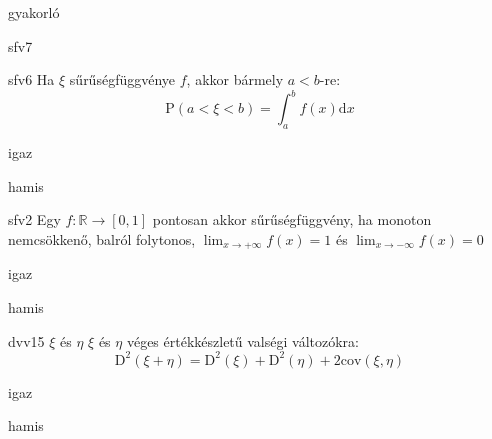 \documentclass[12pt]{article}
\begin{document}
\begin{quiz}{gyakorló}
\begin{multi}[feedback={Def.}]{sfv7}
\end{multi}
\begin{multi}[feedback={Def.}]{sfv6}
Ha $\xi$ sűrűségfüggvénye $f$, akkor bármely $a<b$-re:
$$
\mathrm{P}(a<\xi<b)=\int_{a}^{b}f(x)\mathrm{d } x
$$
\item* igaz
\item hamis
\end{multi}
\begin{multi}[feedback={Def.}]{sfv2}
Egy $f:\mathbb{R}\to [0,1]$ pontosan akkor sűrűségfüggvény, ha monoton nemcsökkenő, 
balról folytonos, $\lim_{x\to+\infty}f(x)=1$ és $\lim_{x\to-\infty}f(x)=0$
\item igaz
\item* hamis
\end{multi}
\begin{multi}[feedback={Tétel. Ez tetszőleges v.v-kre is igaz.}]{dvv15}
$\xi$ és $\eta$ $\xi$ és $\eta$ véges értékkészletű valségi változókra:
$$
\mathrm{D}^2(\xi+\eta)=\mathrm{D}^2(\xi)+\mathrm{D}^2(\eta)+2\mathrm{cov}(\xi,\eta)
$$
\item* igaz
\item hamis
\end{multi}
\end{quiz}
\end{document}
